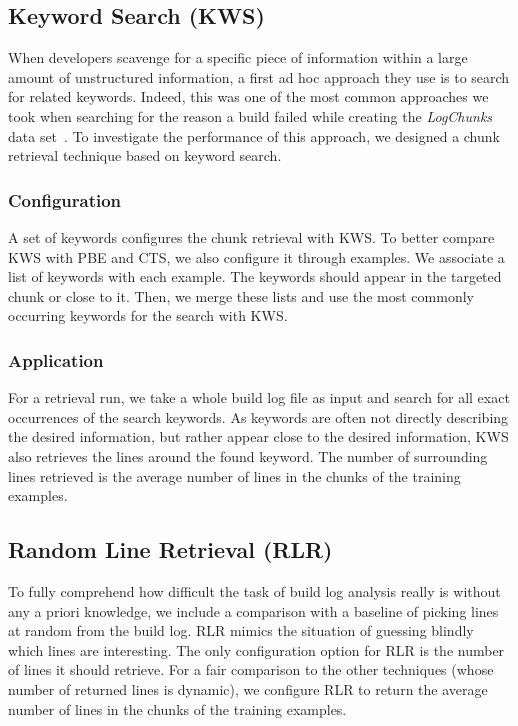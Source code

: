 \subsection{Keyword Search (KWS)}
When developers scavenge for a specific piece of information within a
large amount of unstructured information, a first ad hoc approach they
use is to search for related keywords.
Indeed, this was one of the
most common approaches we took when searching for the reason a build
failed while creating the \emph{LogChunks} data
set~\cite{brandt2020logchunks}.
To investigate the performance of this approach, we
designed a chunk retrieval technique based on keyword search.

\subsubsection{Configuration}
A set of keywords configures the chunk retrieval with KWS\@.
To better
compare KWS with PBE and CTS, we also configure it through examples.
We associate a list of keywords with each example.
The keywords should appear in the targeted
chunk or close to it.
Then, we merge these lists and use the most commonly occurring
keywords for the search with KWS.

\subsubsection{Application}
For a retrieval run, we take a whole build log file as input and
search for all exact occurrences of the search keywords.
As keywords are
often not directly describing the desired information, but rather
appear close to the desired information, KWS also retrieves the lines
around the found keyword.
The number of surrounding lines retrieved is
the average number of lines in the chunks of the training examples.

\subsection{Random Line Retrieval (RLR)}
\label{sec:expl-rlr}
To fully comprehend how difficult the task of build log analysis really
is without any a priori knowledge, we include a comparison with a
baseline of
picking lines at random from the build log.
RLR mimics the
situation of guessing blindly which lines are interesting.
The only configuration option for RLR is the number of lines it should
retrieve.
For a fair comparison to the other techniques (whose number of
returned lines is dynamic), we configure RLR to return the average
number of lines in the chunks of the training examples.

